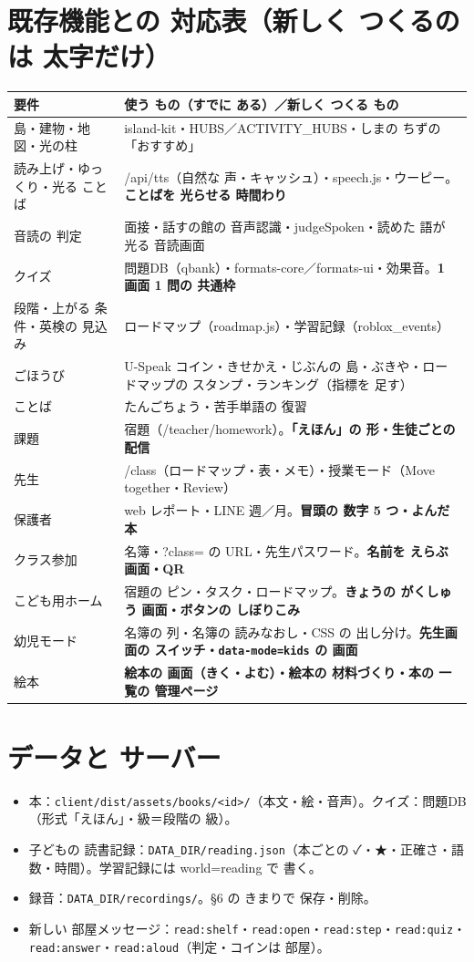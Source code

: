\documentclass[a4paper,10pt]{article}
\begin{document}
\section{既存機能との 対応表（新しく つくるのは 太字だけ）}
\begin{longtable}{@{}L{48mm}L{122mm}@{}}
\toprule
\textbf{要件} & \textbf{使う もの（すでに ある）／新しく つくる もの} \\ \midrule
島・建物・地図・光の柱 & island-kit・HUBS／ACTIVITY\_HUBS・しまの ちずの「おすすめ」\\
読み上げ・ゆっくり・光る ことば & /api/tts（自然な 声・キャッシュ）・speech.js・ウーピー。\textbf{ことばを 光らせる 時間わり}\\
音読の 判定 & 面接・話すの館の 音声認識・judgeSpoken・読めた 語が 光る 音読画面 \\
クイズ & 問題DB（qbank）・formats-core／formats-ui・効果音。\textbf{1 画面 1 問の 共通枠} \\
段階・上がる 条件・英検の 見込み & ロードマップ（roadmap.js）・学習記録（roblox\_events） \\
ごほうび & U-Speak コイン・きせかえ・じぶんの 島・ぶきや・ロードマップの スタンプ・ランキング（指標を 足す）\\
ことば & たんごちょう・苦手単語の 復習 \\
課題 & 宿題（/teacher/homework）。\textbf{「えほん」の 形・生徒ごとの 配信} \\
先生 & /class（ロードマップ・表・メモ）・授業モード（Move together・Review）\\
保護者 & web レポート・LINE 週／月。\textbf{冒頭の 数字 5 つ・よんだ 本} \\
クラス参加 & 名簿・?class= の URL・先生パスワード。\textbf{名前を えらぶ 画面・QR} \\
こども用ホーム & 宿題の ピン・タスク・ロードマップ。\textbf{きょうの がくしゅう 画面・ボタンの しぼりこみ} \\
幼児モード & 名簿の 列・名簿の 読みなおし・CSS の 出し分け。\textbf{先生画面の スイッチ・\texttt{data-mode=kids} の 画面} \\
絵本 & \textbf{絵本の 画面（きく・よむ）・絵本の 材料づくり・本の 一覧の 管理ページ} \\
\bottomrule
\end{longtable}

\section{データと サーバー}
\begin{itemize}
\item 本：\texttt{client/dist/assets/books/<id>/}（本文・絵・音声）。クイズ：問題DB（形式「えほん」・級＝段階の 級）。
\item 子どもの 読書記録：\texttt{DATA\_DIR/reading.json}（本ごとの ✓・★・正確さ・語数・時間）。学習記録には world=reading で 書く。
\item 録音：\texttt{DATA\_DIR/recordings/}。§6 の きまりで 保存・削除。
\item 新しい 部屋メッセージ：\texttt{read:shelf}・\texttt{read:open}・\texttt{read:step}・\texttt{read:quiz}・\texttt{read:answer}・\texttt{read:aloud}（判定・コインは 部屋）。
\end{itemize}
\end{document}
